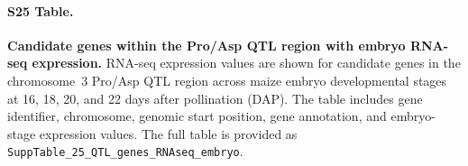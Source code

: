 \paragraph*{S25 Table.}
\makeatletter
\def\@currentlabelname{S25 Table}
\makeatother
\label{S25_Table}
\textbf{Candidate genes within the Pro/Asp QTL region with embryo RNA-seq expression.} RNA-seq expression values are shown for candidate genes in the chromosome~3 Pro/Asp QTL region across maize embryo developmental stages at 16, 18, 20, and 22 days after pollination (DAP). The table includes gene identifier, chromosome, genomic start position, gene annotation, and embryo-stage expression values. The full table is provided as \texttt{SuppTable\_25\_QTL\_genes\_RNAseq\_embryo}.



